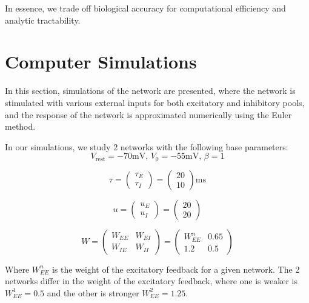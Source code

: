 \documentclass[10pt,twocolumn]{article}
\begin{document}
In essence, we trade off biological accuracy for
computational efficiency and analytic tractability.



\section{Computer Simulations}
In this section, simulations of the network are presented,
where the network is stimulated with various external inputs for
both excitatory and inhibitory pools, and the
response of the network is approximated numerically using the Euler method.

In our simulations, we study 2 networks with the following base parameters:
\begin{equation}
    V_{\text{rest}} = -70 \text{mV, } V_0 = -55 \text{mV, } \beta = 1
\end{equation}

\begin{equation}
    \tau
    = \begin{pmatrix} \tau_E \\ \tau_I \end{pmatrix}
    = \begin{pmatrix} 20 \\ 10 \end{pmatrix}\text{ms}
\end{equation}

\begin{equation}
    u
    = \begin{pmatrix} u_E \\ u_I \end{pmatrix}
    = \begin{pmatrix} 20 \\ 20 \end{pmatrix}
\end{equation}

\begin{equation}
    W
    = \begin{pmatrix} W_{EE} & W_{EI} \\ W_{IE} & W_{II} \end{pmatrix}
    = \begin{pmatrix} W^n_{EE} & 0.65 \\ 1.2 & 0.5 \end{pmatrix}
\end{equation}

Where $W^n_{EE}$ is the weight of the excitatory feedback for a given network.
The 2 networks differ in the weight of the excitatory feedback, where one is weaker
is $W^1_{EE} = 0.5$ and the other is stronger $W^2_{EE} = 1.25$.
\end{document}
